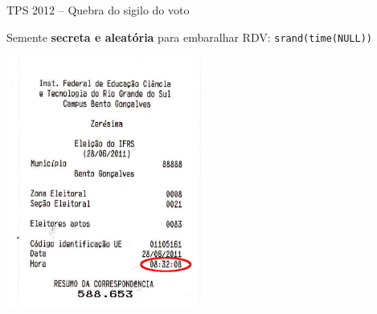 \documentclass[10pt]{beamer}
\begin{document}
\begin{frame}{TPS 2012 -- Quebra do sigilo do voto}
\begin{center}
Semente \textbf{secreta e aleatória} para embaralhar RDV: \texttt{srand(time(NULL))}

\includegraphics[width=0.5\textwidth]{semente.png}
\end{center}
\end{frame}
\end{document}
